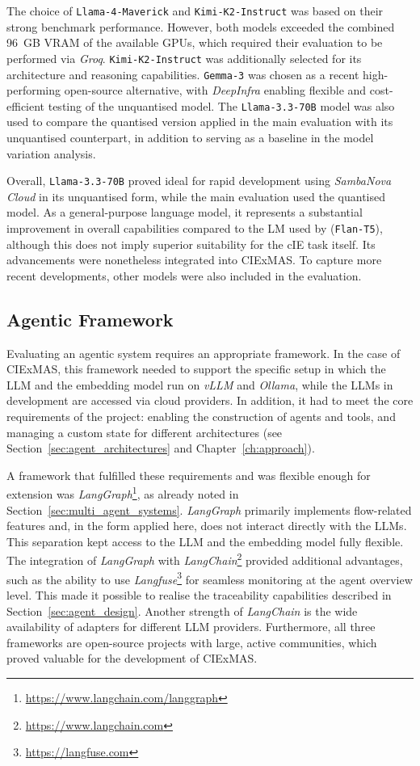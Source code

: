 \documentclass[a4paper,oneside,bibliography=totoc]{scrbook}
\begin{document}
The choice of \texttt{Llama-4-Maverick} and \texttt{Kimi-K2-Instruct} was based on their strong benchmark performance. However, both models exceeded the combined 96~GB VRAM of the available GPUs, which required their evaluation to be performed via \textit{Groq}. \texttt{Kimi-K2-Instruct} was additionally selected for its architecture and reasoning capabilities. \texttt{Gemma-3} was chosen as a recent high-performing open-source alternative, with \textit{DeepInfra} enabling flexible and cost-efficient testing of the unquantised model. The \texttt{Llama-3.3-70B} model was also used to compare the quantised version applied in the main evaluation with its unquantised counterpart, in addition to serving as a baseline in the model variation analysis.

Overall, \texttt{Llama-3.3-70B} proved ideal for rapid development using \textit{SambaNova Cloud} in its unquantised form, while the main evaluation used the quantised model. As a general-purpose language model, it represents a substantial improvement in overall capabilities compared to the \ac{LM} used by \citet{Josifoski2023} (\texttt{Flan-T5}), although this does not imply superior suitability for the \ac{cIE} task itself. Its advancements were nonetheless integrated into CIExMAS. To capture more recent developments, other models were also included in the evaluation.

\subsection{Agentic Framework}
\label{subsec:agentic_framework}

Evaluating an agentic system requires an appropriate framework. In the case of CIExMAS, this framework needed to support the specific setup in which the \ac{LLM} and the embedding model run on \textit{vLLM} and \textit{Ollama}, while the \acp{LLM} in development are accessed via cloud providers. In addition, it had to meet the core requirements of the project: enabling the construction of agents and tools, and managing a custom state for different architectures (see Section~\ref{sec:agent_architectures} and Chapter~\ref{ch:approach}).

A framework that fulfilled these requirements and was flexible enough for extension was \textit{LangGraph}\footnote{\url{https://www.langchain.com/langgraph}}, as already noted in Section~\ref{sec:multi_agent_systems}. \textit{LangGraph} primarily implements flow-related features and, in the form applied here, does not interact directly with the \acp{LLM}. This separation kept access to the \ac{LLM} and the embedding model fully flexible. The integration of \textit{LangGraph} with \textit{LangChain}\footnote{\url{https://www.langchain.com}} provided additional advantages, such as the ability to use \textit{Langfuse}\footnote{\url{https://langfuse.com}} for seamless monitoring at the agent overview level. This made it possible to realise the traceability capabilities described in Section~\ref{sec:agent_design}. Another strength of \textit{LangChain} is the wide availability of adapters for different \ac{LLM} providers. Furthermore, all three frameworks are open-source projects with large, active communities, which proved valuable for the development of CIExMAS.
\end{document}
